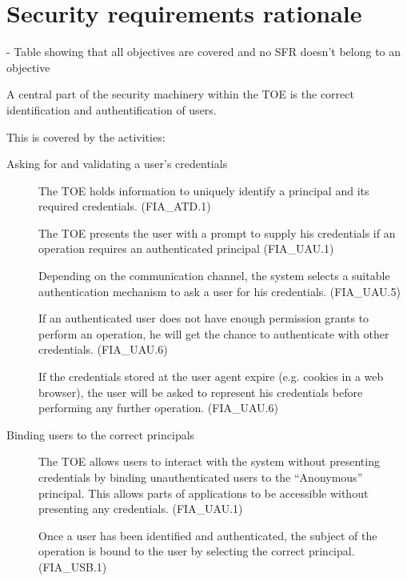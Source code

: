 \documentclass[12pt,english]{scrbook}
\begin{document}
\section{Security requirements rationale}

- Table showing that all objectives are covered and no SFR doesn't belong to an objective



    A central part of the security machinery within the TOE is the correct
    identification and authentification of users.

    This is covered by the activities:

    \begin{description}
        \item[Asking for and validating a user's credentials]

            The TOE holds information to uniquely identify a principal and its
            required credentials. (FIA\_ATD.1) 
            
            The TOE presents the user with a prompt to supply his credentials
            if an operation requires an authenticated principal (FIA\_UAU.1)

            Depending on the communication channel, the system selects a
            suitable authentication mechanism to ask a user for his
            credentials. (FIA\_UAU.5)

            If an authenticated user does not have enough permission grants to
            perform an operation, he will get the chance to authenticate with
            other credentials. (FIA\_UAU.6)

            If the credentials stored at the user agent expire (e.g. cookies in
            a web browser), the user will be asked to represent his credentials
            before performing any further operation. (FIA\_UAU.6)

        \item[Binding users to the correct principals]

            The TOE allows users to interact with the system without presenting
            credentials by binding unauthenticated users to the ``Anonymous''
            principal. This allows parts of applications to be accessible without
            presenting any credentials. (FIA\_UAU.1)

            Once a user has been identified and authenticated, the subject of
            the operation is bound to the user by selecting the correct
            principal. (FIA\_USB.1)


\end{description}
\end{document}

